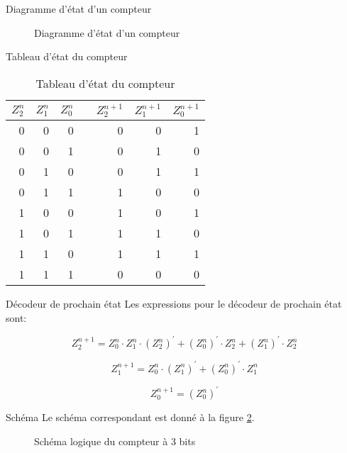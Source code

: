 \documentclass[presentation]{beamer}
\begin{document}
\begin{frame}[label={sec:orga9b5425}]{Diagramme d'état d'un compteur}
\begin{figure}[htbp]
\centering

\caption{\label{fig:org8401128}Diagramme d'état d'un compteur}
\end{figure}
\end{frame}

\begin{frame}[label={sec:org5b4acc8}]{Tableau d'état du compteur}
\begin{table}[htbp]
\caption{\label{tab:org29bf720}Tableau d'état du compteur}
\centering
\begin{tabular}{rrrlrrr}
\(Z_2^n\) & \(Z_1^n\) & \(Z_0^n\) &  & \(Z_2^{n+1}\) & \(Z_1^{n+1}\) & \(Z_0^{n+1}\)\\[0pt]
\hline
0 & 0 & 0 &  & 0 & 0 & 1\\[0pt]
0 & 0 & 1 &  & 0 & 1 & 0\\[0pt]
0 & 1 & 0 &  & 0 & 1 & 1\\[0pt]
0 & 1 & 1 &  & 1 & 0 & 0\\[0pt]
1 & 0 & 0 &  & 1 & 0 & 1\\[0pt]
1 & 0 & 1 &  & 1 & 1 & 0\\[0pt]
1 & 1 & 0 &  & 1 & 1 & 1\\[0pt]
1 & 1 & 1 &  & 0 & 0 & 0\\[0pt]
\end{tabular}
\end{table}
\end{frame}

\begin{frame}[label={sec:orgf0d47af}]{Décodeur de prochain état}
Les expressions pour le décodeur de prochain état sont: 

$$  Z_2^{n+1} = Z_0^n \cdot Z_1^n \cdot (Z_2^{n})^\prime + (Z_0^{n})^\prime \cdot Z_2^n + (Z_1^{n})^\prime \cdot Z_2^n $$

$$  Z_1^{n+1} = Z_0^{n} \cdot (Z_1^{n})^\prime + (Z_0^{n})^\prime \cdot Z_1^n $$

$$  Z_0^{n+1} = (Z_0^{n})^\prime $$
\end{frame}

\begin{frame}[label={sec:org4b50e6e}]{Schéma}
Le schéma correspondant est donné à la figure \ref{fig:orgd8fffb4}.

\begin{figure}[htbp]
\centering

\caption{\label{fig:orgd8fffb4}Schéma logique du compteur à 3 bits}
\end{figure}
\end{frame}
\end{document}
